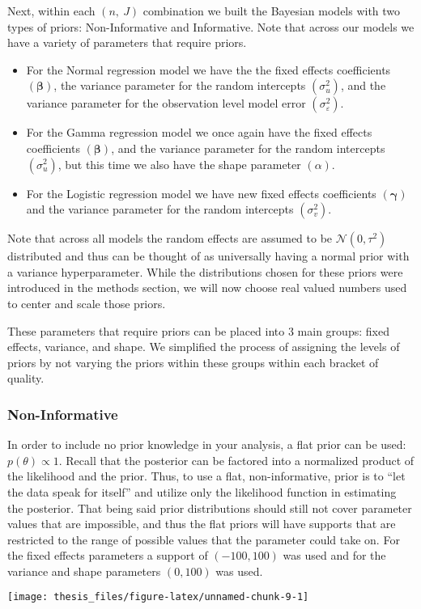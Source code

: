 \documentclass[12pt,twoside]{reedthesis}
\begin{document}
Next, within each \((n,\ J)\) combination we built the Bayesian models with two types of priors: Non-Informative and Informative. Note that across our models we have a variety of parameters that require priors.
\begin{itemize}
\item
  For the Normal regression model we have the the fixed effects coefficients \((\boldsymbol{\beta})\), the variance parameter for the random intercepts \((\sigma_u^2)\), and the variance parameter for the observation level model error \((\sigma_{\varepsilon}^2)\).
\item
  For the Gamma regression model we once again have the fixed effects coefficients \((\boldsymbol{\beta})\), and the variance parameter for the random intercepts \((\sigma_u^2)\), but this time we also have the shape parameter \((\alpha)\).
\item
  For the Logistic regression model we have new fixed effects coefficients \((\boldsymbol{\gamma})\) and the variance parameter for the random intercepts \((\sigma_v^2)\).
\end{itemize}
Note that across all models the random effects are assumed to be \(\mathcal{N}(0, \tau^2)\) distributed and thus can be thought of as universally having a normal prior with a variance hyperparameter. While the distributions chosen for these priors were introduced in the methods section, we will now choose real valued numbers used to center and scale those priors.

These parameters that require priors can be placed into 3 main groups: fixed effects, variance, and shape. We simplified the process of assigning the levels of priors by not varying the priors within these groups within each bracket of quality.

\hypertarget{non-informative}{%
\subsubsection{Non-Informative}\label{non-informative}}

In order to include no prior knowledge in your analysis, a flat prior can be used: \(p(\theta) \propto 1\). Recall that the posterior can be factored into a normalized product of the likelihood and the prior. Thus, to use a flat, non-informative, prior is to ``let the data speak for itself'' and utilize only the likelihood function in estimating the posterior. That being said prior distributions should still not cover parameter values that are impossible, and thus the flat priors will have supports that are restricted to the range of possible values that the parameter could take on. For the fixed effects parameters a support of \((-100, 100)\) was used and for the variance and shape parameters \((0, 100)\) was used.
\begin{center}\texttt{[image: thesis\_files/figure-latex/unnamed-chunk-9-1]} \end{center}
\end{document}
